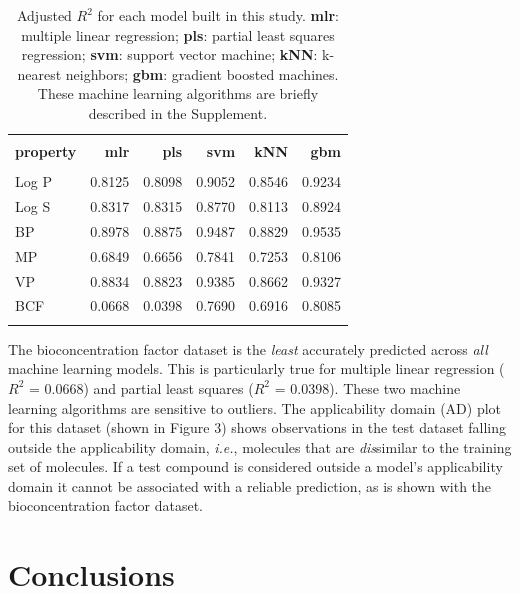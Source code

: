 \documentclass[10pt, letter]{article}
\renewcommand{\=}{\, =\, }
\newcommand{\+}{\, +\, }
\renewcommand{\-}{\, -\, }
\begin{document}
\begin{table}[H]
\begin{center}
\begin{tabular}{lrrrrr}
\toprule
&&\\
{\bf property} & {\bf mlr} & {\bf pls} &  {\bf svm}  & {\bf kNN}  & {\bf gbm}\\
\midrule
&&\\
Log P  &   0.8125 & 0.8098 & 0.9052 & 0.8546 & 0.9234\\
Log S  &   0.8317 & 0.8315 & 0.8770 & 0.8113 & 0.8924\\
BP  &   0.8978 & 0.8875 & 0.9487 & 0.8829 & 0.9535\\
MP  &   0.6849 & 0.6656 & 0.7841 & 0.7253 & 0.8106\\
VP  &   0.8834 & 0.8823 & 0.9385 & 0.8662 & 0.9327\\
BCF  &   0.0668 & 0.0398 & 0.7690 & 0.6916 & 0.8085\\
&&\\
\bottomrule
\end{tabular}
\end{center}
\caption{Adjusted \( R^2\) for each model built in this study. \textbf{mlr}: multiple linear regression; \textbf{pls}: partial least squares regression; \textbf{svm}: support vector machine; \textbf{kNN}: k-nearest neighbors; \textbf{gbm}: gradient boosted machines. These machine learning algorithms are briefly described in the Supplement.}
\end{table}

The bioconcentration factor dataset is the \textit{least} accurately predicted across \textit{all} machine learning models. This is particularly true for multiple linear regression (\( R^2\) = 0.0668) and partial least squares (\( R^2\) = 0.0398). These two machine learning algorithms are sensitive to outliers. The applicability domain (AD) plot for this dataset (shown in Figure 3) shows observations in the test dataset falling outside the applicability domain, \textit{i.e.}, molecules that are \textit{dis}similar to the training set of molecules. If a test compound is considered outside a model’s applicability domain it cannot be associated with a reliable prediction, as is shown with the bioconcentration factor dataset.

\section{Conclusions}
\end{document}
